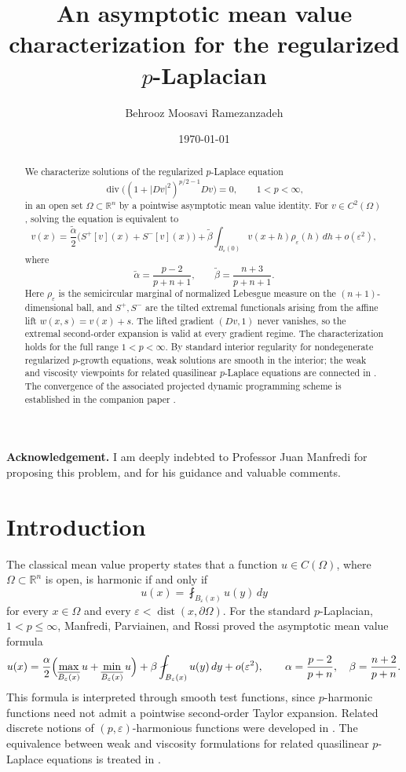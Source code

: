 \documentclass[12pt,reqno]{amsart}
\title[Asymptotic mean value for the regularized
\texorpdfstring{$p$}{p}-Laplacian]%
{An asymptotic mean value characterization for the regularized
\texorpdfstring{$p$}{p}-Laplacian}
\author{Behrooz Moosavi Ramezanzadeh}
\date{\today}
\numberwithin{equation}{section}
\theoremstyle{plain}
\theoremstyle{definition}
\theoremstyle{remark}
\DeclareMathOperator{\divgg}{div}
\DeclareMathOperator{\dist}{dist}
\newcommand{\R}{\mathbb{R}}
\newcommand{\talpha}{\widetilde\alpha}
\newcommand{\tbeta}{\widetilde\beta}
\newcommand{\Sp}{S^+}
\newcommand{\Sm}{S^-}
\newcommand{\rhoeps}{\rho_\varepsilon}
\begin{document}
\begin{abstract}
We characterize solutions of the regularized $p$-Laplace equation
\[
  \divgg\bigl((1+|Dv|^2)^{p/2-1}Dv\bigr)=0,
  \qquad 1<p<\infty,
\]
in an open set $\Omega\subset\R^n$ by a pointwise asymptotic mean value
identity. For $v\in C^2(\Omega)$, solving the equation is
equivalent to
\[
  v(x)
  =
  \frac{\talpha}{2}
  \bigl(\Sp[v](x)+\Sm[v](x)\bigr)
  +
  \tbeta
  \int_{B_\varepsilon(0)}
  v(x+h)\rhoeps(h)\,dh
  +
  o(\varepsilon^2),
\]
where
\[
  \talpha=\frac{p-2}{p+n+1},
  \qquad
  \tbeta=\frac{n+3}{p+n+1}.
\]
Here $\rhoeps$ is the semicircular marginal of normalized Lebesgue measure
on the $(n+1)$-dimensional ball, and $\Sp,\Sm$ are the tilted extremal
functionals arising from the affine lift $w(x,s)=v(x)+s$. The lifted
gradient $(Dv,1)$ never vanishes, so the extremal second-order expansion
is valid at every gradient regime. The characterization holds for the full
range $1<p<\infty$. By standard interior regularity for nondegenerate
regularized $p$-growth equations, weak solutions are smooth in
the interior; the weak and viscosity viewpoints for related quasilinear
$p$-Laplace equations are connected in \cite{JLM01}. The convergence of
the associated projected dynamic programming scheme is established in the
companion paper \cite{Moosavi26}.
\end{abstract}

\maketitle

\noindent\textbf{Acknowledgement.}
I am deeply indebted to Professor Juan Manfredi for proposing this
problem, and for his guidance and valuable comments.

\section{Introduction}
\label{sec:intro}

The classical mean value property states that a function
$u\in C(\Omega)$, where $\Omega\subset\R^n$ is open, is harmonic if and
only if
\[
  u(x)=\fint_{B_\varepsilon(x)}u(y)\,dy
\]
for every $x\in\Omega$ and every
$\varepsilon<\dist(x,\partial\Omega)$. For the standard $p$-Laplacian,
$1<p\le\infty$, Manfredi, Parviainen, and Rossi \cite{MPR10} proved the
asymptotic mean value formula
\[
  u(x)
  =
  \frac{\alpha}{2}
  \Bigl(
    \max_{\overline{B_\varepsilon(x)}}u
    +
    \min_{\overline{B_\varepsilon(x)}}u
  \Bigr)
  +
  \beta\fint_{B_\varepsilon(x)}u(y)\,dy
  +
  o(\varepsilon^2),
  \qquad
  \alpha=\frac{p-2}{p+n},
  \quad
  \beta=\frac{n+2}{p+n}.
\]
This formula is interpreted through smooth test functions, since
$p$-harmonic functions need not admit a pointwise second-order Taylor
expansion. Related discrete notions of $(p,\varepsilon)$-harmonious
functions were developed in \cite{MPR12,LPS14}. The equivalence between
weak and viscosity formulations for related quasilinear $p$-Laplace
equations is treated in \cite{JLM01}.
\end{document}
